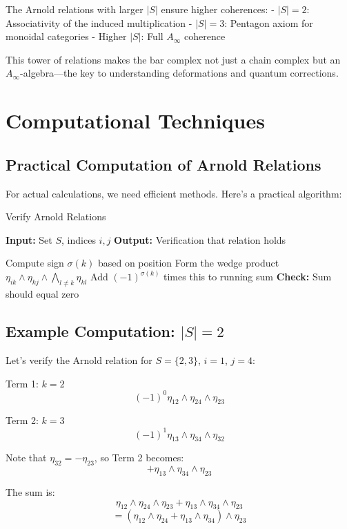 The Arnold relations with larger $|S|$ ensure higher coherences:
- $|S| = 2$: Associativity of the induced multiplication
- $|S| = 3$: Pentagon axiom for monoidal categories
- Higher $|S|$: Full $A_\infty$ coherence

This tower of relations makes the bar complex not just a chain complex but an $A_\infty$-algebra—the key to understanding deformations and quantum corrections.

\section{Computational Techniques}

\subsection{Practical Computation of Arnold Relations}

For actual calculations, we need efficient methods. Here's a practical algorithm:

\begin{algorithm}
\caption{Verify Arnold Relations}
\begin{algorithmic}
\STATE \textbf{Input:} Set $S$, indices $i, j$
\STATE \textbf{Output:} Verification that relation holds

    \STATE Compute sign $\sigma(k)$ based on position
    \STATE Form the wedge product $\eta_{ik} \wedge \eta_{kj} \wedge \bigwedge_{l \neq k} \eta_{kl}$
    \STATE Add $(-1)^{\sigma(k)}$ times this to running sum
\ENDFOR
\STATE \textbf{Check:} Sum should equal zero
\end{algorithmic}
\end{algorithm}

\subsection{Example Computation: $|S| = 2$}

Let's verify the Arnold relation for $S = \{2,3\}$, $i = 1$, $j = 4$:

Term 1: $k = 2$
$$(-1)^0 \eta_{12} \wedge \eta_{24} \wedge \eta_{23}$$

Term 2: $k = 3$
$$(-1)^1 \eta_{13} \wedge \eta_{34} \wedge \eta_{32}$$

Note that $\eta_{32} = -\eta_{23}$, so Term 2 becomes:
$$+\eta_{13} \wedge \eta_{34} \wedge \eta_{23}$$

The sum is:
$$\eta_{12} \wedge \eta_{24} \wedge \eta_{23} + \eta_{13} \wedge \eta_{34} \wedge \eta_{23}$$
$$= (\eta_{12} \wedge \eta_{24} + \eta_{13} \wedge \eta_{34}) \wedge \eta_{23}$$

